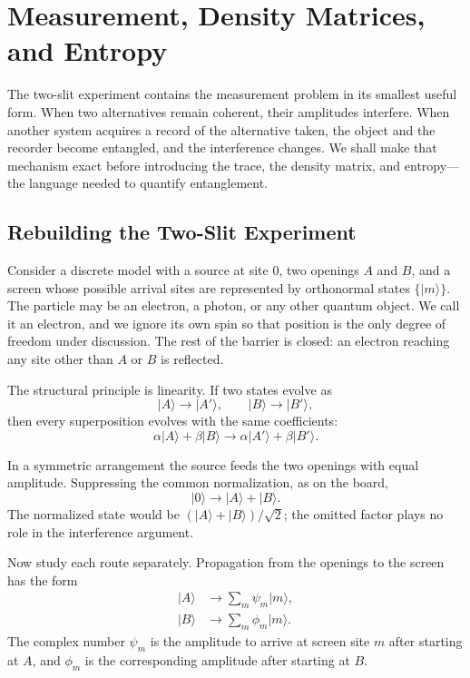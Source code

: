 \chapter{Measurement, Density Matrices, and Entropy}

The two-slit experiment contains the measurement problem in its smallest useful form. When two alternatives remain coherent, their amplitudes interfere. When another system acquires a record of the alternative taken, the object and the recorder become entangled, and the interference changes. We shall make that mechanism exact before introducing the trace, the density matrix, and entropy---the language needed to quantify entanglement.

\section{Rebuilding the Two-Slit Experiment}

Consider a discrete model with a source at site \(0\), two openings \(A\) and \(B\), and a screen whose possible arrival sites are represented by orthonormal states \(\{|m\rangle\}\). The particle may be an electron, a photon, or any other quantum object. We call it an electron, and we ignore its own spin so that position is the only degree of freedom under discussion. The rest of the barrier is closed: an electron reaching any site other than \(A\) or \(B\) is reflected.

The structural principle is linearity. If two states evolve as
\begin{equation}
|A\rangle\longrightarrow |A'\rangle,
\qquad
|B\rangle\longrightarrow |B'\rangle,
\end{equation}
then every superposition evolves with the same coefficients:
\begin{equation}
\alpha|A\rangle+\beta|B\rangle
\longrightarrow
\alpha|A'\rangle+\beta|B'\rangle.
\end{equation}

In a symmetric arrangement the source feeds the two openings with equal amplitude. Suppressing the common normalization, as on the board,
\begin{equation}
|0\rangle\longrightarrow |A\rangle+|B\rangle.
\end{equation}
The normalized state would be \((|A\rangle+|B\rangle)/\sqrt{2}\); the omitted factor plays no role in the interference argument.

Now study each route separately. Propagation from the openings to the screen has the form
\begin{align}
|A\rangle &\longrightarrow \sum_m \psi_m|m\rangle, \\
|B\rangle &\longrightarrow \sum_m \phi_m|m\rangle.
\end{align}
The complex number \(\psi_m\) is the amplitude to arrive at screen site \(m\) after starting at \(A\), and \(\phi_m\) is the corresponding amplitude after starting at \(B\).

